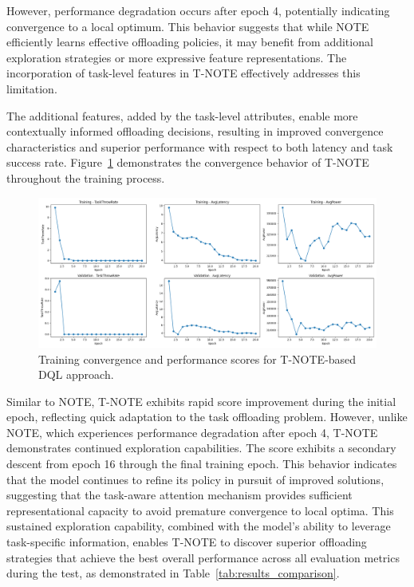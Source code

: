 \documentclass[preprint,3p,authoryear]{elsarticle}
\begin{document}
However, performance degradation occurs after epoch 4, potentially indicating convergence to a local optimum. This behavior suggests that while NOTE efficiently learns effective offloading policies, it may benefit from additional exploration strategies or more expressive feature representations. The incorporation of task-level features in T-NOTE effectively addresses this limitation.

The additional features, added by the task-level attributes, enable more contextually informed offloading decisions, resulting in improved convergence characteristics and superior performance with respect to both latency and task success rate. Figure~\ref{fig:T-NOTE-score-plot} demonstrates the convergence behavior of T-NOTE throughout the training process.

\begin{figure}[H]
    \centering
    \includegraphics[width=1\linewidth]{figs/T-NOTE/score_plot.png}
    \caption{Training convergence and performance scores for T-NOTE-based DQL approach.}
    \label{fig:T-NOTE-score-plot}
\end{figure}

Similar to NOTE, T-NOTE exhibits rapid score improvement during the initial epoch, reflecting quick adaptation to the task offloading problem. However, unlike NOTE, which experiences performance degradation after epoch 4, T-NOTE demonstrates continued exploration capabilities. The score exhibits a secondary descent from epoch 16 through the final training epoch. This behavior indicates that the model continues to refine its policy in pursuit of improved solutions, suggesting that the task-aware attention mechanism provides sufficient representational capacity to avoid premature convergence to local optima. This sustained exploration capability, combined with the model's ability to leverage task-specific information, enables T-NOTE to discover superior offloading strategies that achieve the best overall performance across all evaluation metrics during the test, as demonstrated in Table~\ref{tab:results_comparison}.
\end{document}
